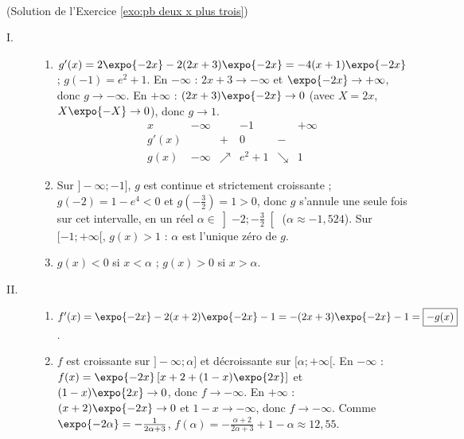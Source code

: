 \begin{corrige}
\begin{sol} ~ \\
(Solution de l'Exercice \ref{exo:pb deux x plus trois})
\begin{description}
\item[I.] \begin{enumerate}
      \item $g'(x) = 2\expo{-2x} - 2(2x + 3)\expo{-2x} = -4(x + 1)\expo{-2x}$ ; $g(-1) = e^2 + 1$.
            En $-\infty$ : $2x + 3 \to -\infty$ et $\expo{-2x} \to +\infty$, donc $g \to -\infty$.
            En $+\infty$ : $(2x + 3)\expo{-2x} \to 0$ (avec $X = 2x$, $X\expo{-X} \to 0$), donc $g \to 1$.
            \[
            \begin{array}{c|ccccc}
            x & -\infty & & -1 & & +\infty \\ \hline
            g'(x) & & + & 0 & - & \\ \hline
            g(x) & -\infty & \nearrow & e^2 + 1 & \searrow & 1
            \end{array}
            \]
      \item Sur $]-\infty ; -1]$, $g$ est continue et strictement croissante ; $g(-2) = 1 - e^4 < 0$ et $g\left(-\frac{3}{2}\right) = 1 > 0$,
            donc $g$ s'annule une seule fois sur cet intervalle, en un r\'eel $\alpha \in \left]-2 ; -\frac{3}{2}\right[$
            ($\alpha \approx -1{,}524$). Sur $[-1 ; +\infty[$, $g(x) > 1$ : $\alpha$ est l'unique z\'ero de $g$.
      \item $g(x) < 0$ si $x < \alpha$ ; $g(x) > 0$ si $x > \alpha$.
      \end{enumerate}
\item[II.] \begin{enumerate}
      \item $f'(x) = \expo{-2x} - 2(x + 2)\expo{-2x} - 1 = -(2x + 3)\expo{-2x} - 1 = \boxed{-g(x)}$.
      \item $f$ est croissante sur $]-\infty ; \alpha]$ et d\'ecroissante sur $[\alpha ; +\infty[$.
            En $-\infty$ : $f(x) = \expo{-2x}\left[ x + 2 + (1 - x)\expo{2x} \right]$ et $(1 - x)\expo{2x} \to 0$, donc $f \to -\infty$.
            En $+\infty$ : $(x + 2)\expo{-2x} \to 0$ et $1 - x \to -\infty$, donc $f \to -\infty$.
            Comme $\expo{-2\alpha} = -\frac{1}{2\alpha + 3}$, $f(\alpha) = -\frac{\alpha + 2}{2\alpha + 3} + 1 - \alpha \approx 12{,}55$.
            \[
            \begin{array}{c|ccccc}

\end{array}\]
\end{enumerate}
\end{description}
\end{sol}
\end{corrige}
